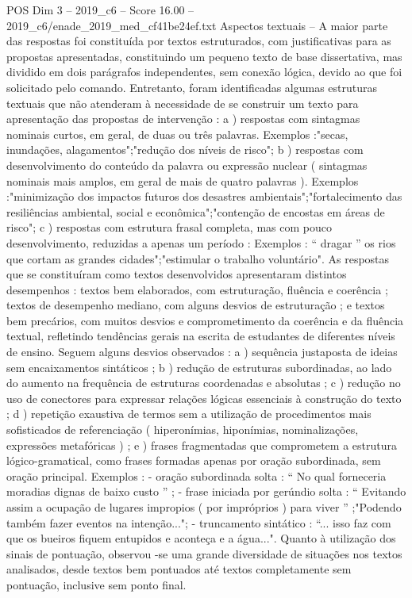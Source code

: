 \begin{textsample}{POS Dim 3 – 2019\_c6 – Score 16.00 – 2019\_c6/enade\_2019\_med\_cf41be24ef.txt}
Aspectos textuais – A maior parte das respostas foi constituída por textos estruturados, com justificativas para as propostas apresentadas, constituindo um pequeno texto de base dissertativa, mas dividido em dois parágrafos independentes, sem conexão lógica, devido ao que foi solicitado pelo comando.
Entretanto, foram identificadas algumas estruturas textuais que não atenderam à necessidade de se construir um texto para apresentação das propostas de intervenção : a ) respostas com sintagmas nominais curtos, em geral, de duas ou três palavras.
Exemplos :"secas, inundações, alagamentos";"redução dos níveis de risco"; b ) respostas com desenvolvimento do conteúdo da palavra ou expressão nuclear ( sintagmas nominais mais amplos, em geral de mais de quatro palavras ).
Exemplos :"minimização dos impactos futuros dos desastres ambientais";"fortalecimento das resiliências ambiental, social e econômica";"contenção de encostas em áreas de risco"; c ) respostas com estrutura frasal completa, mas com pouco desenvolvimento, reduzidas a apenas um período : Exemplos : “ dragar ” os rios que cortam as grandes cidades";"estimular o trabalho voluntário".
As respostas que se constituíram como textos desenvolvidos apresentaram distintos desempenhos : textos bem elaborados, com estruturação, fluência e coerência ; textos de desempenho mediano, com alguns desvios de estruturação ; e textos bem precários, com muitos desvios e comprometimento da coerência e da fluência textual, refletindo tendências gerais na escrita de estudantes de diferentes níveis de ensino.
Seguem alguns desvios observados : a ) sequência justaposta de ideias sem encaixamentos sintáticos ; b ) redução de estruturas subordinadas, ao lado do aumento na frequência de estruturas coordenadas e absolutas ; c ) redução no uso de conectores para expressar relações lógicas essenciais à construção do texto ; d ) repetição exaustiva de termos sem a utilização de procedimentos mais sofisticados de referenciação ( hiperonímias, hiponímias, nominalizações, expressões metafóricas ) ; e ) frases fragmentadas que comprometem a estrutura lógico-gramatical, como frases formadas apenas por oração subordinada, sem oração principal.
Exemplos : - oração subordinada solta : “ No qual forneceria moradias dignas de baixo custo ” ; - frase iniciada por gerúndio solta : “ Evitando assim a ocupação de lugares impropios ( por impróprios ) para viver ” ;"Podendo também fazer eventos na intenção..."; - truncamento sintático : “... isso faz com que os bueiros fiquem entupidos e aconteça e a água...".
Quanto à utilização dos sinais de pontuação, observou -se uma grande diversidade de situações nos textos analisados, desde textos bem pontuados até textos completamente sem pontuação, inclusive sem ponto final.

\end{textsample}
